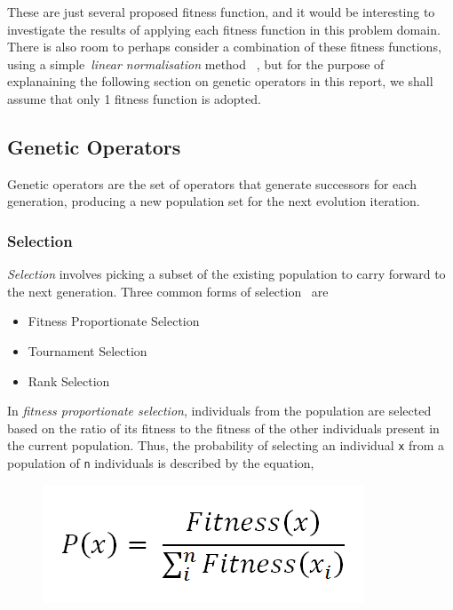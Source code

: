         These are just several proposed fitness function, and it would be interesting to investigate the results of applying each fitness function in this problem domain. There is also room to perhaps consider a combination of these fitness functions, using a simple~\emph{linear normalisation} method ~\cite{linearnorm}, but for the purpose of explanaining the following section on genetic operators in this report, we shall assume that only 1 fitness function is adopted.
   
        \subsection{Genetic Operators}
        Genetic operators are the set of operators that generate successors for each generation, producing a new population set for the next evolution iteration. 
        
        \subsubsection{Selection}
        
        \emph{Selection} involves picking a subset of the existing population to carry forward to the next generation. Three common forms of selection~\cite{mitchell} are
        
        \begin{itemize}
        \item Fitness Proportionate Selection
        \item Tournament Selection
        \item Rank Selection
        \end{itemize}
        
        In \emph{fitness proportionate selection}, individuals from the population are selected based on the ratio of its fitness to the fitness of the other individuals present in the current population. Thus, the probability of selecting an individual \texttt{x} from a population of \texttt{n} individuals is described by the equation,
        
        \begin{figure}[htp]
            \begin{center}
            \includegraphics[scale=0.3]{images/eq_fitpropsel.png}
            \label{equ:fitpropsel}
            \end{center} 
        \end{figure}
        
